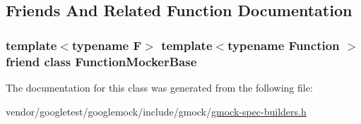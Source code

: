 \subsection{Friends And Related Function Documentation}
\subsubsection[{\texorpdfstring{Function\+Mocker\+Base}{FunctionMockerBase}}]{\setlength{\rightskip}{0pt plus 5cm}template$<$typename F$>$ template$<$typename Function $>$ friend class {\bf Function\+Mocker\+Base}\hspace{0.3cm}{\ttfamily [friend]}}\hypertarget{classtesting_1_1internal_1_1TypedExpectation_a1771ea4a3d92d8b2ff0f0aa6fc40ff55}{}\label{classtesting_1_1internal_1_1TypedExpectation_a1771ea4a3d92d8b2ff0f0aa6fc40ff55}


The documentation for this class was generated from the following file\+:\begin{DoxyCompactItemize}
\item 
vendor/googletest/googlemock/include/gmock/\hyperlink{gmock-spec-builders_8h}{gmock-\/spec-\/builders.\+h}\end{DoxyCompactItemize}
